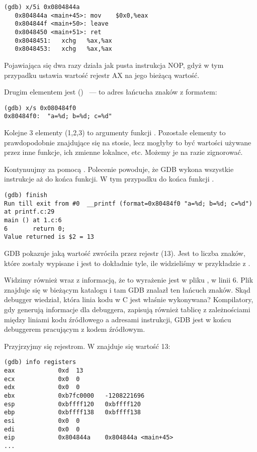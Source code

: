 \begin{lstlisting}[label=NOP_as_XCHG_example,style=customasmx86]
(gdb) x/5i 0x0804844a
   0x804844a <main+45>:	mov    $0x0,%eax
   0x804844f <main+50>:	leave
   0x8048450 <main+51>:	ret
   0x8048451:	xchg   %ax,%ax
   0x8048453:	xchg   %ax,%ax
\end{lstlisting}

Pojawiająca się dwa razy  działa jak pusta instrukcja \ac{NOP}, gdyż w tym przypadku ustawia wartość rejestr AX na jego bieżącą wartość.

Drugim elementem jest () ~--- to adres łańcucha znaków z formatem:

\begin{lstlisting}
(gdb) x/s 0x080484f0
0x80484f0:	"a=%d; b=%d; c=%d"
\end{lstlisting}

Kolejne 3 elementy (1,2,3) to argumenty funkcji \printf.
Pozostałe elementy to prawdopodobnie  znajdujące się na stosie,
lecz mogłyby to być wartości używane przez inne funkcje, ich zmienne lokalnce, etc.
Możemy je na razie zignorować.

Kontynuujmy za pomocą .
Polecenie powoduje, że GDB wykona wszystkie instrukcje aż do końca funkcji.
W tym przypadku do końca funkcji \printf.

\begin{lstlisting}
(gdb) finish
Run till exit from #0  __printf (format=0x80484f0 "a=%d; b=%d; c=%d") at printf.c:29
main () at 1.c:6
6		return 0;
Value returned is $2 = 13
\end{lstlisting}

\ac{GDB} pokazuje jaką wartość \printf zwróciła przez rejestr \EAX (13).
Jest to liczba znaków, które zostały wypisane i jest to dokładnie tyle, ile widzieliśmy w przykładzie z \olly.

Widzimy również  wraz z informacją, że to wyrażenie jest w pliku , w linii 6.
Plik  znajduje się w bieżącym katalogu i tam \ac{GDB} znalazł ten łańcuch znaków.
Skąd debugger wiedział, która linia kodu w C jest właśnie wykonywana?
Kompilatory, gdy generują informacje dla debuggera, zapisują również tablicę z zależnościami między liniami kodu źródłowego a adresami instrukcji,
GDB jest w końcu debuggerem pracującym z kodem źródłowym.

Przyjrzyjmy się rejestrom. W \EAX znajduje się wartość 13:

\begin{lstlisting}
(gdb) info registers
eax            0xd	13
ecx            0x0	0
edx            0x0	0
ebx            0xb7fc0000	-1208221696
esp            0xbffff120	0xbffff120
ebp            0xbffff138	0xbffff138
esi            0x0	0
edi            0x0	0
eip            0x804844a	0x804844a <main+45>
...
\end{lstlisting}

